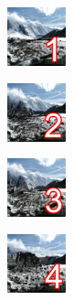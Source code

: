 \newpage







\taskeleven

\begin{code}
    \begin{gridlayout}{\textwidth}{12cm}
        \begin{row}{0.33}
            \begin{cell}{0.25}
                \centering
                \includegraphics[width=0.9\cellwidth]{doc-one/img/thumbnail-1.png}
            \end{cell}
            \begin{cell}{0.25}
                \centering
                \includegraphics[width=0.9\cellwidth]{doc-one/img/thumbnail-2.png}
            \end{cell}
            \begin{cell}{0.25}
                \centering
                \includegraphics[width=0.9\cellwidth]{doc-one/img/thumbnail-3.png}
            \end{cell}
            \begin{cell}{0.25}
                \centering
                \includegraphics[width=0.9\cellwidth]{doc-one/img/thumbnail-4.png}
            \end{cell}
        \end{row}

\end{gridlayout}
\end{code}

